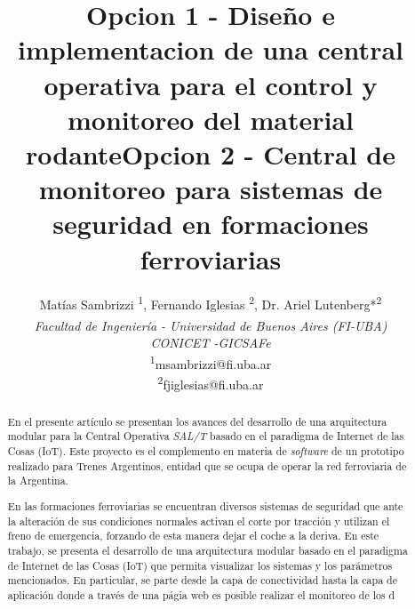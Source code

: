 \documentclass[a4paper]{IEEEtran}
\begin{document}
\title{Opcion 1 - Diseño e implementacion de una central operativa para el control y monitoreo del material rodante}

\title{Opcion 2 - Central de monitoreo para sistemas de seguridad en formaciones ferroviarias \\}


\author{

Matías Sambrizzi\textsuperscript{\dag} \textsuperscript{1}, 
Fernando Iglesias\textsuperscript{\dag} \textsuperscript{2}, 
Dr. Ariel Lutenberg*\textsuperscript{2} \\

\textsuperscript{\dag} \textit{Facultad de Ingeniería - Universidad de Buenos Aires (FI-UBA)} \\
\normalsize * \textit{CONICET -GICSAFe} \\

\textsuperscript{1}\small msambrizzi@fi.uba.ar \\
\textsuperscript{2}\small fjiglesias@fi.uba.ar \\

}


\maketitle

\begin{abstract}

En el presente artículo se presentan los avances del desarrollo de una arquitectura modular para la Central Operativa \textit{SAL/T} basado en el paradigma de Internet de las Cosas (IoT). Este proyecto es el complemento en materia de \textit{software} de un prototipo realizado para Trenes Argentinos, entidad que se ocupa de operar la red ferroviaria de la Argentina.

En las formaciones ferroviarias se encuentran diversos sistemas de seguridad que ante la alteración de sus condiciones normales activan el corte por tracción y utilizan el freno de emergencia, forzando de esta manera dejar el coche a la deriva. En este trabajo, se presenta el desarrollo de una arquitectura modular basado en el paradigma de Internet de las Cosas (IoT) que permita visualizar los sistemas y los parámetros mencionados. En particular, se parte desde la capa de conectividad hasta la capa de aplicación donde a través de una págia web es posible realizar el monitoreo de los d


\end{abstract}
\end{document}
